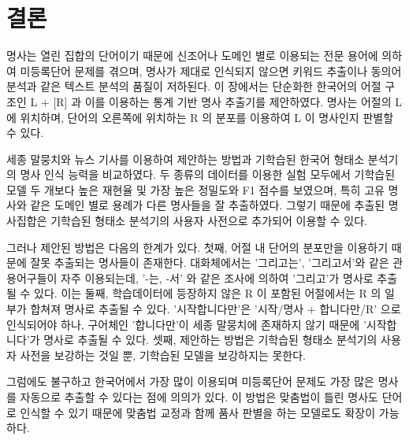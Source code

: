 \documentclass[oneside, ko,phd]{snuthesis_utf8_kor}
\begin{document}
\section{결론}
명사는 열린 집합의 단어이기 때문에 신조어나 도메인 별로 이용되는 전문 용어에 의하여 미등록단어 문제를 겪으며, 명사가 제대로 인식되지 않으면 키워드 추출이나 동의어 분석과 같은 텍스트 분석의 품질이 저하된다.
이 장에서는 단순화한 한국어의 어절 구조인 L + [R] 과 이를 이용하는 통계 기반 명사 추출기를 제안하였다.
명사는 어절의 L 에 위치하며, 단어의 오른쪽에 위치하는 R 의 분포를 이용하여 L 이 명사인지 판별할 수 있다.

세종 말뭉치와 뉴스 기사를 이용하여 제안하는 방법과 기학습된 한국어 형태소 분석기의 명사 인식 능력을 비교하였다.
두 종류의 데이터를 이용한 실험 모두에서 기학습된 모델 두 개보다 높은 재현율 및 가장 높은 정밀도와 F1 점수를 보였으며, 특히 고유 명사와 같은 도메인 별로 용례가 다른 명사들을 잘 추출하였다. 그렇기 때문에 추출된 명사집합은 기학습된 형태소 분석기의 사용자 사전으로 추가되어 이용할 수 있다.

그러나 제안된 방법은 다음의 한계가 있다.
첫째, 어절 내 단어의 분포만을 이용하기 때문에 잘못 추출되는 명사들이 존재한다.
대화체에서는 '그리고는', '그리고서'와 같은 관용어구들이 자주 이용되는데, '-는, -서' 와 같은 조사에 의하여 '그리고'가 명사로 추출될 수 있다.
이는 
둘째, 학습데이터에 등장하지 않은 R 이 포함된 어절에서는 R 의 일부가 합쳐져 명사로 추출될 수 있다.
'시작합니다만'은 '시작/명사 + 합니다만/R' 으로 인식되어야 하나, 구어체인 '합니다만'이 세종 말뭉치에 존재하지 않기 때문에 '시작합니다'가 명사로 추출될 수 있다.
셋째, 제안하는 방법은 기학습된 형태소 분석기의 사용자 사전을 보강하는 것일 뿐, 기학습된 모델을 보강하지는 못한다.

그럼에도 불구하고 한국어에서 가장 많이 이용되며 미등록단어 문제도 가장 많은 명사를 자동으로 추출할 수 있다는 점에 의의가 있다.
이 방법은 맞춤법이 틀린 명사도 단어로 인식할 수 있기 때문에 맞춤법 교정과 함께 품사 판별을 하는 모델로도 확장이 가능하다.
\end{document}

